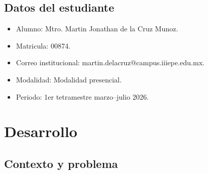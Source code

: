 \documentclass[
	spanish,
	letterpaper, oneside
]{article}
\makeatletter
\def\studentfullname {Mtro. Martin Jonathan de la Cruz Munoz}
\def\studentid {00874}
\def\studentemail {martin.delacruz@campus.iiiepe.edu.mx}
\def\programperiod {1er tetramestre marzo--julio 2026}
\def\programmodality {Modalidad presencial}
\makeatother
\begin{document}

\subsection{Datos del estudiante}

\begin{itemize}
	\item Alumno: \studentfullname.
	\item Matricula: \studentid.
	\item Correo institucional: \studentemail.
	\item Modalidad: \programmodality.
	\item Periodo: \programperiod.
\end{itemize}

%
%
\section{Desarrollo}

\subsection{Contexto y problema}
\end{document}

